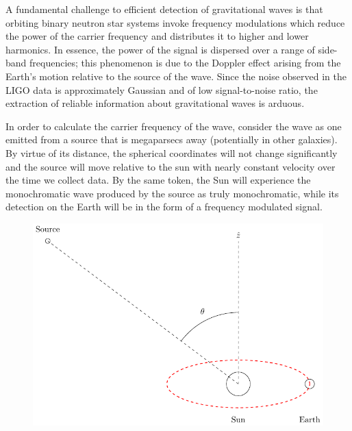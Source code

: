 \documentclass[onecolumn, groupedaddress, 10pt]{revtex4-1}
\begin{document}
A fundamental challenge to efficient detection of gravitational waves is that orbiting binary neutron star systems invoke frequency modulations which reduce the power of the carrier frequency and distributes it to higher and lower harmonics.  In essence, the power of the signal is dispersed over a range of side-band frequencies; this phenomenon is due to the Doppler effect arising from the Earth's motion relative to the source of the wave. Since the noise observed in the LIGO data is approximately Gaussian and of low signal-to-noise ratio, the extraction of reliable information about gravitational waves is arduous.

In order to calculate the carrier frequency of the wave, consider the wave as one emitted from a source that is megaparsecs away (potentially in other galaxies). By virtue of its distance, the spherical coordinates will not change significantly and the source will move relative to the sun with nearly constant velocity over the time we collect data. By the same token, the Sun will experience the monochromatic wave produced by the source as truly monochromatic, while its detection on the Earth will be in the form of a frequency modulated signal.

\begin{figure}[ht]
	\centering
	\includegraphics[width=.75\linewidth]{earthMotionModulationFigure.pdf}
	\caption{\label{fig:earthMotionModulationFigure}}
\end{figure}
\end{document}
